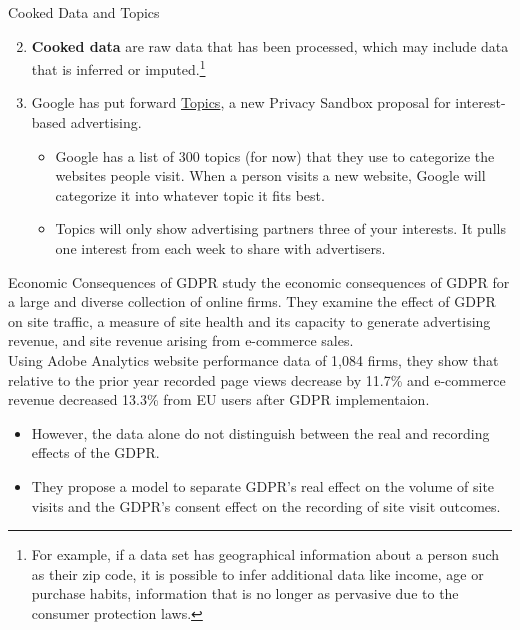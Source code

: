 \documentclass[pdf]{beamer}
\newcommand{\empr}[1]{{\color{franklinblue}\textbf{#1}}}
\theoremstyle{remark}
\theoremstyle{definition}
\begin{document}
\begin{frame}[t]{Cooked Data and Topics}
\begin{enumerate}
\setcounter{enumi}{1} 
  \item  \empr{Cooked data} are  raw data that has been processed, which may include data that is inferred or imputed.\footnote{For example, if a data set has geographical information about a person such as their zip code, it is possible to infer additional data like income, age or purchase habits, information that is no longer as pervasive due to the consumer protection laws.} 
  \item Google has put forward \href{https://blog.google/products/chrome/get-know-new-topics-api-privacy-sandbox/}{Topics}, a new Privacy Sandbox proposal for interest-based advertising. 
\begin{itemize}
  \item Google has a list of 300 topics (for now) that they use to categorize the websites people visit. When a person visits a new website, Google will categorize it into whatever topic it fits best.  
  \item Topics will only show advertising partners three of your interests. It pulls one interest from each week to share with advertisers.
\end{itemize}
\end{enumerate}
\end{frame}

\begin{frame}[t]{Economic Consequences of GDPR}
\cite{goldberg2024} study the economic consequences of GDPR for a large and diverse collection of online firms.  They examine the effect of GDPR on site traffic, a measure of site health and its capacity to generate advertising revenue, and site revenue arising from e-commerce sales.  \\
\vspace{1.5ex}
Using Adobe Analytics website performance data of 1,084 firms, they show that relative to the prior year recorded page views decrease by 11.7\% and e-commerce revenue decreased 13.3\% from EU users after GDPR implementaion. \\
\vspace{1.5ex}
\begin{itemize}
\item However, the data alone do not distinguish between the real and recording effects of the GDPR. 
\item They propose a model to separate GDPR's real effect on the volume of site visits and the GDPR's consent effect on the recording of site visit outcomes. 
\end{itemize}
\end{frame}
\end{document}

